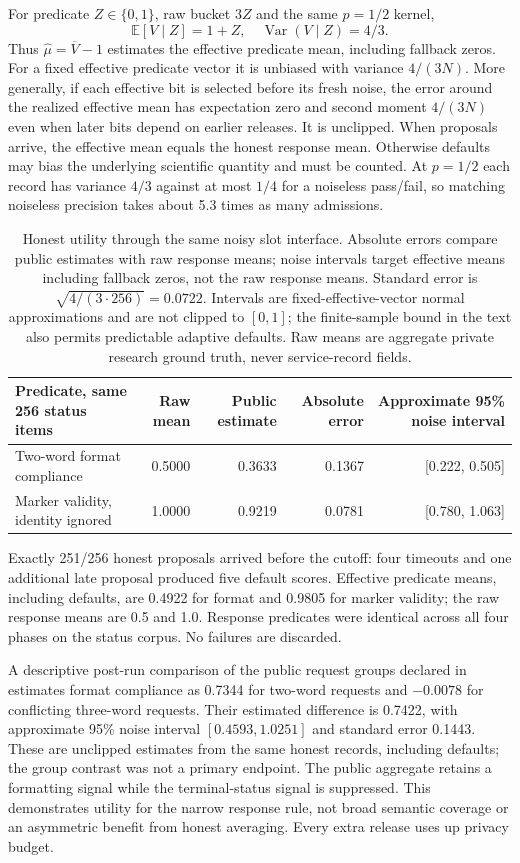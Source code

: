 \documentclass[10pt,twocolumn]{article}
\begin{document}
For predicate $Z\in\{0,1\}$, raw bucket $3Z$ and the same $p=1/2$ kernel,
\[
\mathbb E[V\mid Z]=1+Z,\quad
\operatorname{Var}(V\mid Z)=4/3.
\]
Thus $\hat\mu=\overline V-1$ estimates the effective predicate mean, including fallback zeros. For a fixed effective predicate vector it is unbiased with variance $4/(3N)$. More generally, if each effective bit is selected before its fresh noise, the error around the realized effective mean has expectation zero and second moment $4/(3N)$ even when later bits depend on earlier releases. It is unclipped. When proposals arrive, the effective mean equals the honest response mean. Otherwise defaults may bias the underlying scientific quantity and must be counted. At $p=1/2$ each record has variance $4/3$ against at most $1/4$ for a noiseless pass/fail, so matching noiseless precision takes about 5.3 times as many admissions.

\begin{table}[t]\centering\small
\begin{tabular}{lrrrr}\toprule
Predicate, same 256 status items & Raw mean & Public estimate & Absolute error & Approximate 95\% noise interval\\\midrule
Two-word format compliance & 0.5000 & 0.3633 & 0.1367 & [0.222, 0.505]\\
Marker validity, identity ignored & 1.0000 & 0.9219 & 0.0781 & [0.780, 1.063]\\
\bottomrule\end{tabular}
\caption{Honest utility through the same noisy slot interface. Absolute errors compare public estimates with raw response means; noise intervals target effective means including fallback zeros, not the raw response means. Standard error is $\sqrt{4/(3\cdot256)}=0.0722$. Intervals are fixed-effective-vector normal approximations and are not clipped to $[0,1]$; the finite-sample bound in the text also permits predictable adaptive defaults. Raw means are aggregate private research ground truth, never service-record fields.}\label{tab:sameutility}
\end{table}

Exactly 251/256 honest proposals arrived before the cutoff: four timeouts and one additional late proposal produced five default scores. Effective predicate means, including defaults, are 0.4922 for format and 0.9805 for marker validity; the raw response means are 0.5 and 1.0. Response predicates were identical across all four phases on the status corpus. No failures are discarded.

A descriptive post-run comparison of the public request groups declared in  estimates format compliance as 0.7344 for two-word requests and $-0.0078$ for conflicting three-word requests. Their estimated difference is 0.7422, with approximate 95\% noise interval $[0.4593,1.0251]$ and standard error 0.1443. These are unclipped estimates from the same honest records, including defaults; the group contrast was not a primary endpoint. The public aggregate retains a formatting signal while the terminal-status signal is suppressed. This demonstrates utility for the narrow response rule, not broad semantic coverage or an asymmetric benefit from honest averaging. Every extra release uses up privacy budget.
\end{document}
